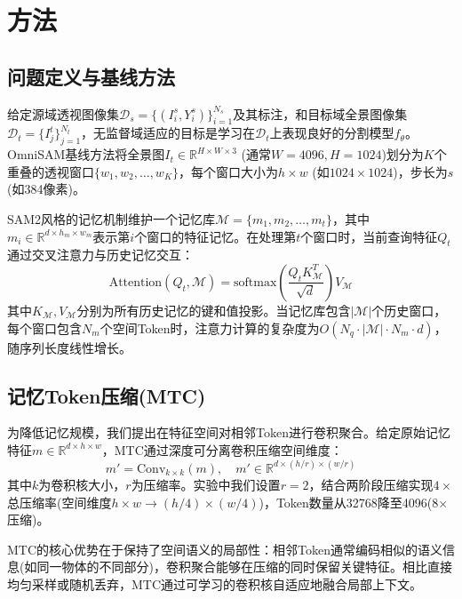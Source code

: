 \section{方法}

\subsection{问题定义与基线方法}

给定源域透视图像集$\mathcal{D}_s=\{(I_i^s, Y_i^s)\}_{i=1}^{N_s}$及其标注，和目标域全景图像集$\mathcal{D}_t=\{I_j^t\}_{j=1}^{N_t}$，无监督域适应的目标是学习在$\mathcal{D}_t$上表现良好的分割模型$f_\theta$。OmniSAM基线方法将全景图$I_t \in \mathbb{R}^{H \times W \times 3}$ (通常$W=4096, H=1024$)划分为$K$个重叠的透视窗口$\{w_1, w_2, \ldots, w_K\}$，每个窗口大小为$h \times w$ (如$1024 \times 1024$)，步长为$s$ (如384像素)。

SAM2风格的记忆机制维护一个记忆库$\mathcal{M}=\{m_1, m_2, \ldots, m_t\}$，其中$m_i \in \mathbb{R}^{d \times h_m \times w_m}$表示第$i$个窗口的特征记忆。在处理第$t$个窗口时，当前查询特征$Q_t$通过交叉注意力与历史记忆交互：
\begin{equation}
\text{Attention}(Q_t, \mathcal{M}) = \text{softmax}\left(\frac{Q_t K_{\mathcal{M}}^T}{\sqrt{d}}\right) V_{\mathcal{M}}
\end{equation}
其中$K_{\mathcal{M}}, V_{\mathcal{M}}$分别为所有历史记忆的键和值投影。当记忆库包含$|\mathcal{M}|$个历史窗口，每个窗口包含$N_m$个空间Token时，注意力计算的复杂度为$O(N_q \cdot |\mathcal{M}| \cdot N_m \cdot d)$，随序列长度线性增长。

\subsection{记忆Token压缩(MTC)}

为降低记忆规模，我们提出在特征空间对相邻Token进行卷积聚合。给定原始记忆特征$m \in \mathbb{R}^{d \times h \times w}$，MTC通过深度可分离卷积压缩空间维度：
\begin{equation}
m' = \text{Conv}_{k \times k}(m), \quad m' \in \mathbb{R}^{d \times (h/r) \times (w/r)}
\end{equation}
其中$k$为卷积核大小，$r$为压缩率。实验中我们设置$r=2$，结合两阶段压缩实现$4 \times$总压缩率(空间维度$h \times w \rightarrow (h/4) \times (w/4)$)，Token数量从32768降至4096(8$\times$压缩)。

MTC的核心优势在于保持了空间语义的局部性：相邻Token通常编码相似的语义信息(如同一物体的不同部分)，卷积聚合能够在压缩的同时保留关键特征。相比直接均匀采样或随机丢弃，MTC通过可学习的卷积核自适应地融合局部上下文。

